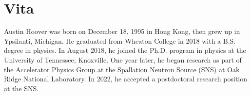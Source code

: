 \chapter*{Vita} 

Austin Hoover was born on December 18, 1995 in Hong Kong, then grew up in Ypsilanti, Michigan. He graduated from Wheaton College in 2018 with a B.S. degree in physics. In August 2018, he joined the Ph.D. program in physics at the University of Tennessee, Knoxville. One year later, he began research as part of the Accelerator Physics Group at the Spallation Neutron Source (SNS) at Oak Ridge National Laboratory. In 2022, he accepted a postdoctoral research position at the SNS.
